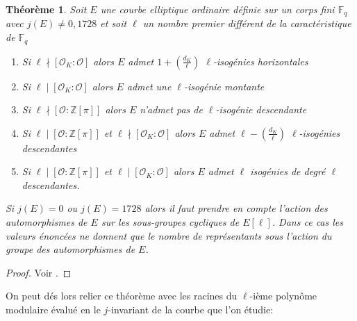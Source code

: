 \documentclass[10pt,a4paper]{book}
\theoremstyle{plain}
\newtheorem{thm}{Théorème}[chapter]
\theoremstyle{definition}
\theoremstyle{definition}
\theoremstyle{definition}
\theoremstyle{definition}
\theoremstyle{definition}
\theoremstyle{remark}
\theoremstyle{remark}
\theoremstyle{definition}
\begin{document}
\begin{thm}
\label{thm:Koh:cas}
Soit $E$ une courbe elliptique ordinaire définie sur un corps fini 
$\mathbb{F}_q$ avec $j(E)\neq 0, 1728$ et soit $\ell$ un nombre premier 
différent de la caractéristique de $\mathbb{F}_q$
\begin{enumerate}
\item Si $\ell \nmid [\mathcal{O}_K : \mathcal{O}]$ alors $E$ admet $ 1 + \left( \frac{d_K}{\ell} \right)$ $\ell$-isogénies horizontales
\item Si $\ell \mid [\mathcal{O}_K : \mathcal{O}]$ alors $E$ admet une $\ell$-isogénie montante
\item Si $\ell \nmid [\mathcal{O} : \mathbb{Z}[\pi]]$ alors $E$ n'admet pas de $\ell$-isogénie descendante
\item Si $\ell \mid [\mathcal{O} : \mathbb{Z}[\pi]]$ et $\ell \nmid [\mathcal{O}_K : \mathcal{O}]$ alors $E$ admet $\ell-\left( \frac{d_K}{\ell} \right)$ $\ell$-isogénies descendantes
\item  Si $\ell \mid [\mathcal{O} : \mathbb{Z}[\pi]]$ et $\ell \mid [\mathcal{O}_K : \mathcal{O}]$ alors $E$ admet $\ell$ isogénies de degré $\ell$ descendantes.
\end{enumerate}
Si $j(E)=0$ ou $j(E)=1728$ alors il faut prendre en compte l'action des 
automorphismes de $E$ sur les sous-groupes cycliques de $E[\ell]$. Dans ce cas
les valeurs énoncées ne donnent que le nombre de représentants 
sous l'action du groupe des automorphismes de $E$.
\end{thm}

\begin{proof}
Voir \cite[Proposition 23]{Kohel96}.
\end{proof}

On peut dés lors relier ce théorème avec les racines du $\ell$-ième polynôme modulaire évalué en le $j$-invariant de la courbe que l'on étudie:
\end{document}
